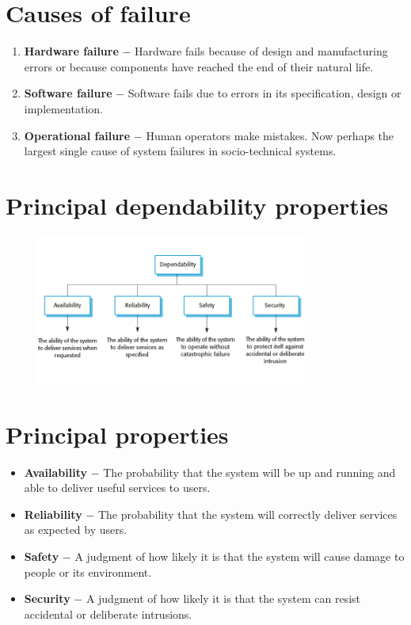 \section{Causes of failure}
\begin{enumerate}
\item \textbf{Hardware failure}
$-$ Hardware fails because of design and manufacturing errors or because components have reached the end of their natural life.
\item \textbf{Software failure}
$-$ Software fails due to errors in its specification, design or implementation.
\item \textbf{Operational failure}
$-$ Human operators make mistakes. Now perhaps the largest single cause of system failures in socio-technical systems.
\end{enumerate}

\section{Principal dependability properties}
\begin{figure}[h!]
    \centering
    \includegraphics[width = 0.8\textwidth]{./figures/L4_1.png}
    \caption{}
    \label{fig:L4_1}
\end{figure}


\section{Principal properties}
\begin{itemize}
\item \textbf{Availability}
$-$ The probability that the system will be up and running and able to deliver useful services to users.

\item \textbf{Reliability}
$-$ The probability that the system will correctly deliver services as expected by users.

\item \textbf{Safety}
$-$ A judgment of how likely it is that the system will cause damage to people or its environment.

\item \textbf{Security}
$-$ A judgment of how likely it is that the system can resist accidental or deliberate intrusions.
\end{itemize}
